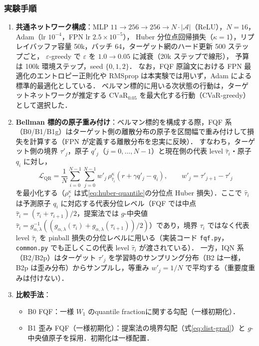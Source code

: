 \documentclass[a4paper,10pt]{jsarticle}
\theoremstyle{definition}
\newcommand{\CVaR}{\mathrm{CVaR}}
\newcommand{\Wone}{W_1}
\begin{document}
\subsubsection{実験手順}
\begin{enumerate}
  \item \textbf{共通ネットワーク構成}：MLP $11\to256\to256\to N\cdot|\mathcal A|$（ReLU），$N=16$，Adam（lr $10^{-4}$，FPN lr $2.5\times10^{-5}$），
  Huber 分位点回帰損失（$\kappa=1$），リプレイバッファ容量 50k，バッチ 64，ターゲット網のハード更新 500 ステップごと，
  $\varepsilon$-greedy で $\varepsilon$ を $1.0\to0.05$ に減衰（20k ステップで線形），
  予算は 100k 環境ステップ，seed $\{0,1,2\}$．
  なお，FQF 原論文における FPN 最適化のエントロピー正則化や RMSprop は本実験では用いず，Adam による標準的最適化としている．
  ベルマン標的に用いる次状態の行動は，ターゲットネットワークが推定する $\CVaR_{0.05}$ を最大化する行動（CVaR-greedy）として選択した．
  \item \textbf{Bellman 標的の原子重み付け}：ベルマン標的を構成する際，FQF 系（B0/B1/B1g）はターゲット側の離散分布の原子を区間幅で重み付けして損失を計算する（FPN が定義する離散分布を忠実に反映）．
  すなわち，ターゲット側の境界 $\tau'_j$，原子 $q'_j$（$j=0,\dots,N-1$）と現在側の代表 level $\hat\tau_i$・原子 $q_i$ に対し，
  \begin{equation}
    \mathcal{L}_{\mathrm{QR}}=\frac1N\sum_{i=0}^{N-1}\sum_{j=0}^{N-1} w'_j\,\rho^\kappa_{\hat\tau_i}\!\left(r+\gamma q'_j-q_i\right),\qquad w'_j=\tau'_{j+1}-\tau'_j
    \label{eq:b-loss}
  \end{equation}
  を最小化する（$\rho^\kappa_\tau$ は式\eqref{eq:huber-quantile}の分位点 Huber 損失）．ここで $\hat\tau_i$ は予測原子 $q_i$ に対応する代表分位レベル（FQF では中点 $\hat\tau_i=(\tau_i+\tau_{i+1})/2$，提案法では $g$-中央値 $\hat\tau_i=g_{\alpha,\lambda}^{-1}((g_{\alpha,\lambda}(\tau_i)+g_{\alpha,\lambda}(\tau_{i+1}))/2)$）であり，境界 $\tau_i$ ではなく代表 level $\hat\tau_i$ を pinball 損失の分位レベルに用いる（実装コード \texttt{fqf.py}，\texttt{common.py} でも正しくこの代表 level $\hat\tau_i$ が渡されている）．
  一方，IQN 系（B2/B2p）はターゲット $\tau'_j$ を学習時のサンプリング分布（B2 は一様，B2p は歪み分布）からサンプルし，等重み $w'_j=1/N$ で平均する（重要度重みは付けない）．
  \item \textbf{比較手法}：
  \begin{itemize}
    \item B0 FQF：一様 $\Wone$ のquantile fractionに関する勾配（一様初期化）．
    \item B1 歪み FQF（一様初期化）：提案法の境界勾配（式\eqref{eq:dist-grad}）と $g$-中央値原子を採用．初期化は一様配置．

\end{itemize}
\end{enumerate}
\end{document}
